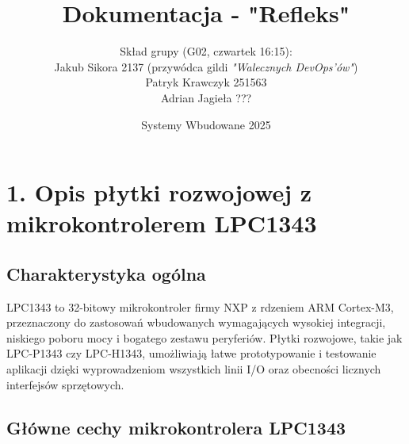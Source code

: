 \documentclass[a4paper,12pt]{report}
\title{Dokumentacja - "Refleks"}
\date{Systemy Wbudowane 2025}
\author{Skład grupy (G02, czwartek 16:15):\\
Jakub Sikora 2137 (przywódca gildi \textit{"Walecznych DevOps'ów"})\\
Patryk Krawczyk 251563\\
Adrian Jagieła ???}
\begin{document}
\maketitle

\section*{1. Opis płytki rozwojowej z mikrokontrolerem LPC1343}

\subsection*{Charakterystyka ogólna}

LPC1343 to 32-bitowy mikrokontroler firmy NXP z rdzeniem ARM Cortex-M3, przeznaczony do zastosowań wbudowanych wymagających wysokiej integracji, niskiego poboru mocy i bogatego zestawu peryferiów. Płytki rozwojowe, takie jak LPC-P1343 czy LPC-H1343, umożliwiają łatwe prototypowanie i testowanie aplikacji dzięki wyprowadzeniom wszystkich linii I/O oraz obecności licznych interfejsów sprzętowych.

\subsection*{Główne cechy mikrokontrolera LPC1343}
\end{document}
